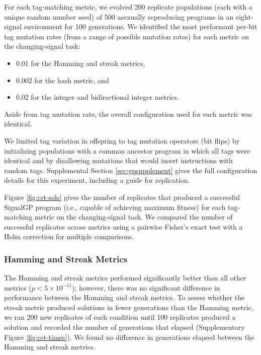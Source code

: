 For each tag-matching metric, we evolved 200 replicate populations (each with a unique random number seed) of 500 asexually reproducing programs in an eight-signal environment for 100 generations.
We identified the most performant per-bit tag mutation rates (from a range of possible mutation rates) for each metric on the changing-signal task:
\begin{itemize}
    \item 0.01 for the Hamming and streak metrics,
    \item 0.002 for the hash metric, and
    \item 0.02 for the integer and bidirectional integer metrics.
\end{itemize}
Aside from tag mutation rate, the overall configuration used for each metric was identical.

We limited tag variation in offspring to tag mutation operators (bit flips) by initializing populations with a common ancestor program in which all tags were identical and by disallowing mutations that would insert instructions with random tags.
Supplemental Section \ref{sec:gpsupplement} gives the full configuration details for this experiment, including a guide for replication.

% 

Figure \ref{fig:cst-sols} gives the number of replicates that produced a successful SignalGP program (i.e., capable of achieving maximum fitness) for each tag-matching metric on the changing-signal task.
We compared the number of successful replicates across metrics using a pairwise Fisher's exact test with a Holm correction for multiple comparisons.

\subsubsection{Hamming and Streak Metrics}

The Hamming and streak metrics performed significantly better than all other metrics ($p < 5\times10^{-11}$); however, there was no significant difference in performance between the Hamming and streak metrics.
To assess whether the streak metric produced solutions in fewer generations than the Hamming metric, we ran 200 new replicates of each condition until 100 replicates produced a solution and recorded the number of generations that elapsed (Supplementary Figure \ref{fig:cst-times}).
We found no difference in generations elapsed between the Hamming and streak metrics.

